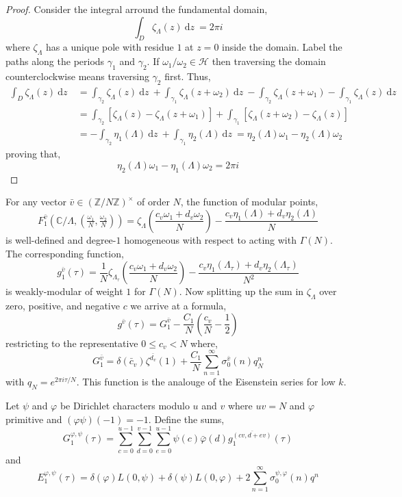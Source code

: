 \documentclass{article}
\newcommand{\Z}{\mathbb{Z}}
\newcommand{\C}{\mathbb{C}}
\renewcommand{\d}[1]{\: \mathrm{d}#1 \:}
\theoremstyle{definition}
\newenvironment{definition}[1][Definition:]{\begin{trivlist}
\item[\hskip \labelsep {\bfseries #1}]}{\end{trivlist}}
\newcommand{\half}{\mathcal{H}}
\begin{document}
\begin{proof}
Consider the integral arround the fundamental domain,
\[ \int_{D} \zeta_\Lambda(z) \d{z} = 2 \pi i \]
where $\zeta_\Lambda$ has a unique pole with residue $1$ at $z = 0$ inside the domain. Label the paths along the periods $\gamma_1$ and $\gamma_2$. If $\omega_1 / \omega_2 \in \half$ then traversing the domain counterclockwise means traversing $\gamma_2$ first. Thus, 
\begin{align*}
\int_D \zeta_\Lambda(z) \d{z} & = \int_{\gamma_2} \zeta_\Lambda(z) \d{z} + \int_{\gamma_1} \zeta_\Lambda(z + \omega_2) \d{z} - \int_{\gamma_2} \zeta_\Lambda(z + \omega_1) - \int_{\gamma_1} \zeta_\Lambda(z) \d{z} 
\\
& = \int_{\gamma_2} \left[ \zeta_\Lambda(z) - \zeta_\Lambda(z + \omega_1) \right] + \int_{\gamma_1} \left[ \zeta_\Lambda(z + \omega_2) - \zeta_\Lambda(z) \right] 
\\
& = - \int_{\gamma_2} \eta_1(\Lambda) \d{z} + \int_{\gamma_1} \eta_2(\Lambda) \d{z} = \eta_2(\Lambda) \omega_1 - \eta_2(\Lambda) \omega_2 
\end{align*}
proving that,
\[ \eta_2(\Lambda) \omega_1 - \eta_1(\Lambda) \omega_2 = 2 \pi i \]  
\end{proof}


For any vector $\bar{v} \in (\Z / N \Z)^\times$ of order $N$, the function of modular points,
\[ F_1^{\bar{v}}(\C / \Lambda, (\tfrac{\omega_1}{N}, \tfrac{\omega_2}{N})) = \zeta_\Lambda \left( \frac{c_v \omega_1 + d_v \omega_2}{N} \right) - \frac{c_v \eta_1(\Lambda) + d_v \eta_2(\Lambda)}{N} \]
is well-defined and degree-$1$ homogeneous with respect to acting with $\Gamma(N)$. The corresponding function,
\[ g_1^{\bar{v}}(\tau) = \frac{1}{N} \zeta_{\Lambda_\tau} \left( \frac{c_v \omega_1 + d_v \omega_2}{N} \right) - \frac{c_v \eta_1(\Lambda_\tau) + d_v \eta_2(\Lambda_\tau)}{N^2} \] 
is weakly-modular of weight $1$ for $\Gamma(N)$. Now splitting up the sum in $\zeta_\Lambda$ over zero, positive, and negative $c$ we arrive at a formula,
\[ g^{\bar{v}}(\tau) = G_1^{\bar{v}} - \frac{C_1}{N} \left( \frac{c_v}{N} - \frac{1}{2} \right) \]
restricting to the representative $0 \le c_v < N$ where,
\[ G_1^{\bar{v}} = \delta(\bar{c}_v) \zeta^{\bar{d_v}}(1) + \frac{C_1}{N} \sum_{n = 1}^\infty \sigma_0^{\bar{v}}(n) q_N^n \]
with $q_N = e^{2 \pi i  \tau / N}$. This function is the analouge of the Eisenstein series for low $k$. 

\begin{definition}
Let $\psi$ and $\varphi$ be Dirichlet characters modulo $u$ and $v$ where $uv = N$ and $\varphi$ primitive and $(\varphi \psi)(-1) = -1$. Define the sums,
\[ G_1^{\varphi, \psi}(\tau) = \sum_{c = 0}^{u - 1} \sum_{d = 0}^{v - 1} \sum_{e = 0}^{u - 1} \psi(c) \bar{\varphi}(d) g_1^{\overline{(cv, d + ev)}} (\tau) \]
and
\[ E_1^{\varphi, \psi}(\tau) = \delta(\varphi) L(0, \psi) + \delta(\psi) L(0, \varphi) + 2 \sum_{n = 1}^\infty \sigma_0^{\psi, \varphi}(n) q^n \]
\end{definition}
\end{document}

